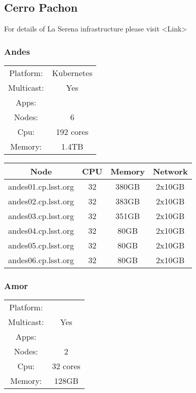 \newpage
\subsection{Cerro Pachon}
For details of La Serena infrastructure please visit <Link>
\newpage
\subsubsection{Andes}

\begin{center}
  \begin{tabular}{ |c|c| } 
   \hline
   Platform: & Kubernetes \\ 
   Multicast: & Yes \\ 
   Apps: &  \\ 
   Nodes: & 6 \\ 
   Cpu: & 192 cores \\ 
   Memory: & 1.4TB \\ 
   \hline
  \end{tabular}
\end{center}

\begin{center}
  \begin{tabular}{||c c c c||} 
    \hline
    Node & CPU & Memory & Network \\ [0.5ex] 
    \hline\hline
    andes01.cp.lsst.org & 32 & 380GB & 2x10GB \\
    \hline
    andes02.cp.lsst.org & 32 & 383GB & 2x10GB \\
    \hline
    andes03.cp.lsst.org & 32 & 351GB & 2x10GB \\
    \hline
    andes04.cp.lsst.org & 32 & 80GB & 2x10GB \\
    \hline
    andes05.cp.lsst.org & 32 & 80GB & 2x10GB \\
    \hline
    andes06.cp.lsst.org & 32 & 80GB & 2x10GB \\
    \hline
  \end{tabular}
\end{center}

\newpage
\subsubsection{Amor}

\begin{center}
  \begin{tabular}{ |c|c| } 
   \hline
   Platform: &  \\ 
   Multicast: & Yes \\ 
   Apps: &  \\ 
   Nodes: & 2 \\ 
   Cpu: & 32 cores \\ 
   Memory: & 128GB \\ 
   \hline
  \end{tabular}
\end{center}

